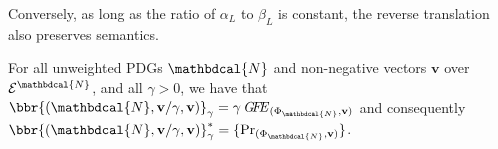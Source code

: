 \documentclass[letterpaper]{article} %
\theoremstyle{plain}
\newtheorem{coro}{Corollary}[theorem]
\theoremstyle{definition}
\theoremstyle{remark}
\newcommand{\begthm}[3][]{\begin{#2}[{name=#1},restate=#3,label=#3]}
\newcommand{\commentout}[1]{\ignorespaces}
\newcommand\mat[1]{\mathbf{#1}}
\newcommand{\bp}[1][L]{\mat{p}_{\!_{#1}\!}}
\newcommand{\Ed}{\mathcal E}
\newcommand{\dg}[1]{\mathbdcal{#1}}
\newcommand{\Gr}{\mathcal G}
\newcommand\GFE{\mathit{G\mkern-4mu F\mkern-4.5mu E}}
\newcommand{\ed}[3]{#2\!%
  \overset{\smash{\mskip-5mu\raisebox{-1pt}{$\scriptscriptstyle
        #1$}}}{\rightarrow}\! #3}
\begin{document}
Conversely, as long as the ratio of $\alpha_L$ to $\beta_L$ is constant, the
reverse translation also preserves semantics.
\begthm{theorem}{thm:pdg-is-wfg}
For all unweighted PDGs $\dg{N}$ and non-negative vectors $\mat v$
over $\Ed^{\dg N}$, and all $\gamma > 0$, we have that 
$\bbr{(\dg N, \mat v/\gamma, \mat v)}_{\gamma} 
		= \gamma\,\GFE_{(\Phi_{\dg N}, \mat v)} $ and consequently
$\bbr{(\dg N, \mat v/\gamma, \mat v)}_{\gamma}^*
		= \{\Pr_{(\Phi_{\dg N}, \mat v)} \}$. 
\end{theorem}


\commentout{
We have seen that only a subset of PDGs can be faithfully 
represented as WFGs; we now show the other side of the correspondence: any
factor graph be captured by more than one PDG (though again, only for a fixed $\gamma$).
}
\end{document}
